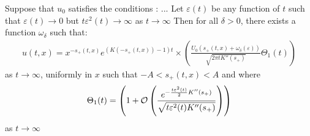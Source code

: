 \documentclass[11pt]{amsart}
\begin{document}
\begin{theorem}
    Suppose that  $u_0$ satisfies the conditions : ...
    Let $\varepsilon(t)$ be any function of $t$ such that $\varepsilon(t) \to 0$ but $t\varepsilon^2(t) \to \infty$ as $t \to \infty$
Then for all $\delta > 0$, there exists a function $\omega_\delta$ such that:
\begin{equation*}
    \begin{split}
    u(t,x) = x^{-s_+(t,x)}e^{(K(-s_+(t,x))-1)t} \times 
    \left( \frac{U_0(s_+(t,x)+\omega_\delta(\varepsilon))}{\sqrt{2\pi tK''(s_+)}} \Theta_1(t)\right)
    \end{split}
\end{equation*}
as $t\to \infty$, uniformly in $x$ such that $-A < s_+(t,x)< A$ and where 
\begin{align*}
    \Theta_1(t) = \left(1 + \mathcal{O} \left( \frac{e^{-\frac{t\varepsilon^2(t)}{2}K''(s_+)}}{\sqrt{t\varepsilon^2(t)K''(s_+)}} \right) \right)
\end{align*}
as $t \to \infty$
\end{theorem}
\end{document}
